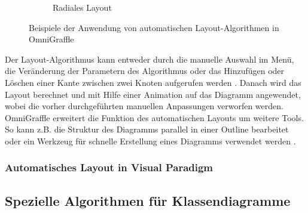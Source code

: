 \begin{figure}[hbt]
\begin{subfigure}{\subfigureshortwidth}
        \caption{Radiales Layout}
        \label{fig:omnigraffle-automatic-layout-f}
    \end{subfigure}
    \caption{Beispiele der Anwendung von automatischen Layout-Algorithmen in OmniGraffle}
    \label{fig:omnigraffle-automatic-layout}
\end{figure}

Der Layout-Algorithmus kann entweder durch die manuelle Auswahl im Menü, die Veränderung der Parametern des Algorithmus oder das Hinzufügen oder Löschen einer Kante zwischen zwei Knoten aufgerufen werden \cite[S.43]{Wybrow08Using}. Danach wird das Layout berechnet und mit Hilfe einer Animation auf das Diagramm angewendet, wobei die vorher durchgeführten manuellen Anpassungen verworfen werden. OmniGraffle erweitert die Funktion des automatischen Layouts um weitere Tools. So kann z.B. die Struktur des Diagramms parallel in einer Outline bearbeitet oder ein Werkzeug für schnelle Erstellung eines Diagramms verwendet werden \cite{08OmniGraffle}.

\subsubsection{Automatisches Layout in Visual Paradigm}



\subsection{Spezielle Algorithmen für Klassendiagramme}






